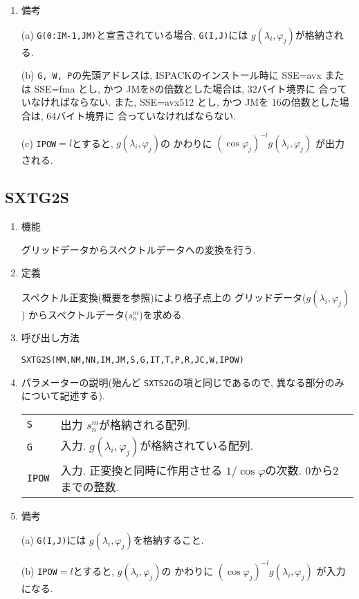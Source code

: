 \documentclass[a4j]{jsarticle}
\begin{document}
\begin{enumerate}
\item 備考

(a) \texttt{G(0:IM-1,JM)}と宣言されている場合, \texttt{G(I,J)}には
    $g(\lambda_i,\varphi_j)$が格納される.

(b) \texttt{G, W, P}の先頭アドレスは, 
ISPACKのインストール時に SSE=avx または SSE=fma とし, かつ
JMを8の倍数とした場合は, 32バイト境界に
合っていなければならない.
また, SSE=avx512 とし, かつ
JMを 16の倍数とした場合は, 64バイト境界に
合っていなければならない.

(c) \texttt{IPOW}$=l$とすると, $g(\lambda_i,\varphi_j)$の
    かわりに $(\cos\varphi_j)^{-l}g(\lambda_i,\varphi_j)$ が出力
    される.

\end{enumerate}


\subsection{SXTG2S}

\begin{enumerate}

\item 機能 

グリッドデータからスペクトルデータへの変換を行う.

\item 定義

スペクトル正変換(概要を参照)により格子点上の
グリッドデータ($g(\lambda_i,\varphi_j)$)
からスペクトルデータ($s^m_n$)を求める.

\item 呼び出し方法 

\texttt{SXTG2S(MM,NM,NN,IM,JM,S,G,IT,T,P,R,JC,W,IPOW)}

\item パラメーターの説明(殆んど \texttt{SXTS2G}の項と同じであるので,
異なる部分のみについて記述する).

\begin{tabular}{ll}
\texttt{S} & 出力 $s^m_n$が格納される配列.\\
\texttt{G} & 入力. $g(\lambda_i,\varphi_j)$が格納されている配列.\\
\texttt{IPOW} & 入力. 正変換と同時に作用させる
                      $1/\cos\varphi$の次数. 0から2までの整数.
\end{tabular}

\item 備考

(a) \texttt{G(I,J)}には
    $g(\lambda_i,\varphi_j)$を格納すること.

(b) \texttt{IPOW}$=l$とすると, $g(\lambda_i,\varphi_j)$の
    かわりに $(\cos\varphi_j)^{-l}g(\lambda_i,\varphi_j)$ が入力
    になる. 
   
\end{enumerate}
\end{document}
